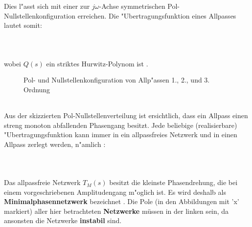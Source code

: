 {\nit Dies l"asst sich mit einer zur $j\omega$-Achse symmetrischen
Pol-Nullstellen\-konfiguration erreichen.  Die
"Uber\-tragungs\-funktion eines Allpasses lautet somit:\\~\\
\\~\\
wobei $Q(s)$ ein striktes Hurwitz-Polynom ist \cite{MOS:89}. 
\begin{figure}[!htb]\vspace*{-3mm}
\begin{center} %
\hspace*{-1cm}\hspace*{-1.5cm}\hspace*{-1.5cm}\vspace*{-9mm}\caption{Pol- und Nullstellenkonfiguration von Allp"assen 1., 2., und 3. Ordnung}
\end{center}
\vspace*{-6mm}
\end{figure}\\
\nit Aus der skizzierten Pol-Nullstellenverteilung ist
ersichtlich, dass ein Allpass einen streng monoton abfallenden Phasengang
besitzt. Jede beliebige (realisierbare) "Ubertragungsfunktion kann immer in ein
allpassfreies Netzwerk und in einen Allpass zerlegt werden, n"amlich \cite{FRE:BOS:04, UNB:81}:\\~\\
\\~\\
Das allpassfreie Netzwerk $T_{M}(s)$ besitzt die kleinste
Phasendrehung, die bei einem vorgeschriebenen Amplitudengang m"oglich
ist. Es wird deshalb als {\bf
  Minimalphasennetzwerk} bezeichnet
\cite{FRE:BOS:04}. Die Pole (in den Abbildungen mit 'x' markiert)
aller hier betrachteten {\bf Netzwerke} m\"ussen in
der linken  sein, da ansonsten
die Netzwerke {\bf instabil} sind.

}
